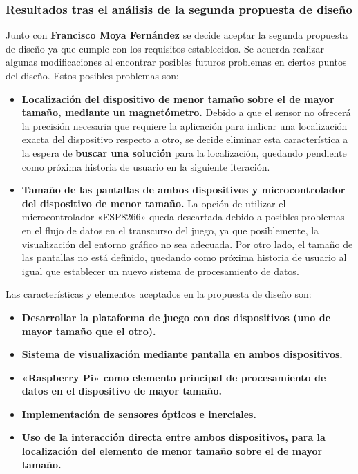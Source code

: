 \subsubsection{Resultados tras el análisis de la segunda propuesta de diseño}
Junto con \textbf{Francisco Moya Fernández} se decide aceptar la segunda propuesta de diseño ya que cumple con los requisitos establecidos. Se acuerda realizar algunas modificaciones al encontrar posibles futuros problemas en ciertos puntos del diseño. Estos posibles problemas son:
\begin{itemize}
\item \textbf{Localización del dispositivo de menor tamaño sobre el de mayor tamaño, mediante un magnetómetro.} Debido a que el sensor no ofrecerá la precisión necesaria que requiere la aplicación para indicar una localización exacta del dispositivo respecto a otro, se decide eliminar esta característica a la espera de \textbf{buscar una solución} para la localización, quedando pendiente como próxima historia de usuario en la siguiente iteración.
\item \textbf{Tamaño de las pantallas de ambos dispositivos y microcontrolador del dispositivo de menor tamaño.} La opción de utilizar el microcontrolador «ESP8266» queda descartada debido a posibles problemas en el flujo de datos en el transcurso del juego, ya que posiblemente, la visualización del entorno gráfico no sea adecuada. Por otro lado, el tamaño de las pantallas no está definido, quedando como próxima historia de usuario al igual que establecer un nuevo sistema de procesamiento de datos.
\end{itemize}

Las características y elementos aceptados en la propuesta de diseño son:\
\begin{itemize}
\item \textbf{Desarrollar la plataforma de juego con dos dispositivos (uno de mayor tamaño que el otro).}
\item \textbf{Sistema de visualización mediante pantalla en ambos dispositivos.}
\item \textbf{«Raspberry Pi» como elemento principal de procesamiento de datos en el dispositivo de mayor tamaño.}
\item \textbf{Implementación de sensores ópticos e inerciales.} 
\item \textbf{Uso de la interacción directa entre ambos dispositivos, para la localización del elemento de menor tamaño sobre el de mayor tamaño.}
\end{itemize}

